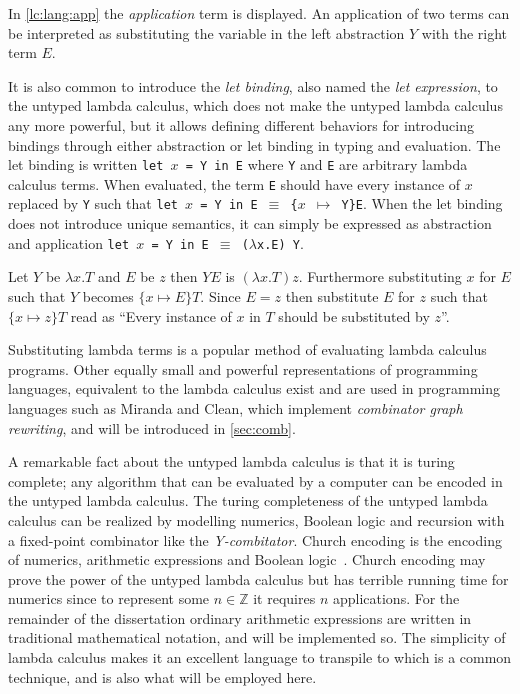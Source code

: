 In \autoref{lc:lang:app} the \textit{application} term is displayed.
An application of two terms can be interpreted as substituting the variable in the left abstraction $Y$ with the right term $E$.

It is also common to introduce the \textit{let binding}, also named the \textit{let expression}, to the untyped lambda calculus, which does not make the untyped lambda calculus any more powerful, but it allows defining different behaviors for introducing bindings through either abstraction or let binding in typing and evaluation.
The let binding is written \texttt{let $x$ = Y in E} where \texttt{Y} and \texttt{E} are arbitrary lambda calculus terms.
When evaluated, the term \texttt{E} should have every instance of $x$ replaced by \texttt{Y} such that \texttt{let $x$ = Y in E $\equiv$ \{$x$ $\mapsto$ Y\}E}.
When the let binding does not introduce unique semantics, it can simply be expressed as abstraction and application \texttt{let $x$ = Y in E $\equiv$ ($\lambda$x.E) Y}.

\begin{exmp}
\label{ex:application}
Let $Y$ be $\lambda x . T$ and $E$ be $z$ then $Y E$ is $(\lambda x . T) z$.
Furthermore substituting $x$ for $E$ such that $Y$ becomes $\{x \mapsto E\}T$.
Since $E = z$ then substitute $E$ for $z$ such that $\{x \mapsto z\}T$ read as ``Every instance of $x$ in $T$ should be substituted by $z$''.
\end{exmp}
\begin{remark}
Substituting lambda terms is a popular method of evaluating lambda calculus programs.
Other equally small and powerful representations of programming languages, equivalent to the lambda calculus exist and are used in programming languages such as Miranda and Clean, which implement \textit{combinator graph rewriting}, and will be introduced in \autoref{sec:comb}.
\end{remark}

A remarkable fact about the untyped lambda calculus is that it is turing complete; any algorithm that can be evaluated by a computer can be encoded in the untyped lambda calculus.
The turing completeness of the untyped lambda calculus can be realized by modelling numerics, Boolean logic and recursion with a fixed-point combinator like the \textit{Y-combitator}.
Church encoding is the encoding of numerics, arithmetic expressions and Boolean logic~\cite{church1985calculi}.
Church encoding may prove the power of the untyped lambda calculus but has terrible running time for numerics since to represent some $n \in \mathbb{Z}$ it requires $n$ applications.
For the remainder of the dissertation ordinary arithmetic expressions are written in traditional mathematical notation, and will be implemented so.
The simplicity of lambda calculus makes it an excellent language to transpile to which is a common technique, and is also what will be employed here.

